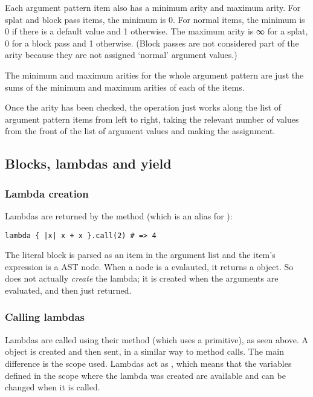Each argument pattern item also has a minimum arity and maximum arity. For splat and block pass items, the minimum is 0. For normal items, the minimum is 0 if there is a default value and 1 otherwise. The maximum arity is ∞ for a splat, 0 for a block pass and 1 otherwise. (Block passes are not considered part of the arity because they are not assigned `normal' argument values.)

The minimum and maximum arities for the whole argument pattern are just the sums of the minimum and maximum arities of each of the items.

Once the arity has been checked, the  operation just works along the list of argument pattern items from left to right, taking the relevant number of values from the front of the list of argument values and making the assignment.

\subsection{Blocks, lambdas and yield}

\subsubsection{Lambda creation}

Lambdas are returned by the  method (which is an alias for ):

\begin{lstlisting}
lambda { |x| x + x }.call(2) # => 4
\end{lstlisting}

The literal block is parsed as an item in the argument list and the item's expression is a  AST node. When a  node is a evalauted, it returns a  object. So  does not actually \textit{create} the lambda; it is created when the arguments are evaluated, and then just returned.

\subsubsection{Calling lambdas}

Lambdas are called using their  method (which uses a primitive), as seen above. A  object is created and then sent, in a similar way to method calls. The main difference is the scope used. Lambdas act as , which means that the variables defined in the scope where the lambda was created are available and can be changed when it is called.

